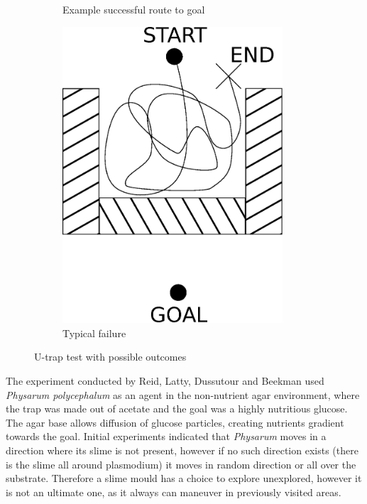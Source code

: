 \documentclass[english,a4paper,twoside]{ppfcmthesis}
\begin{document}
\begin{figure}
\begin{subfigure}{0.37\textwidth}
    \caption{Example successful route to goal}
    \label{figure:bp_trap_model_success}
  \end{subfigure}
  \begin{subfigure}{0.37\textwidth}
    \centering
    \includegraphics[width=0.9\textwidth]{background/physarum/trap_failure.eps}
    \caption{Typical failure}
    \label{figure:bp_trap_model_failure}
  \end{subfigure}
  \caption{U-trap test with possible outcomes}
\end{figure}

The experiment conducted by Reid, Latty, Dussutour and Beekman \cite{reid2012slime} used \textit{Physarum polycephalum} as an agent in the non-nutrient agar environment, where the trap was made out of acetate and the goal was a highly nutritious glucose. The agar base allows diffusion of glucose particles, creating nutrients gradient towards the goal. Initial experiments indicated that \textit{Physarum} moves in a direction where its slime is not present, however if no such direction exists (there is the slime all around plasmodium) it moves in random direction or all over the substrate. Therefore a slime mould has a choice to explore unexplored, however it is not an ultimate one, as it always can maneuver in previously visited areas. 
\end{document}
